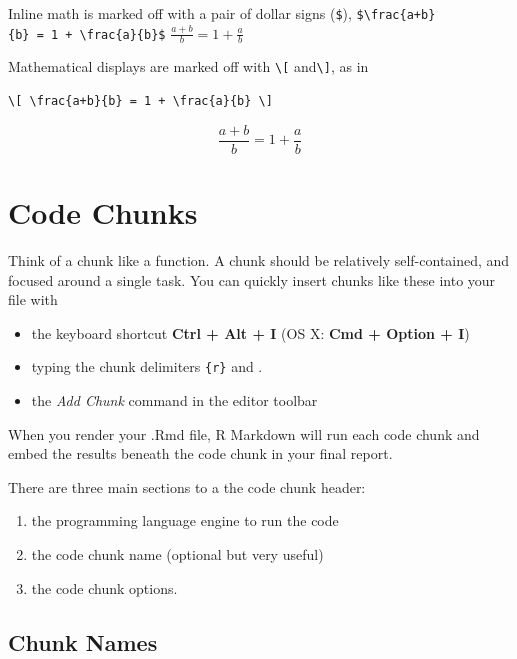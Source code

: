 \documentclass[]{book}
\providecommand{\tightlist}{%
  \setlength{\itemsep}{0pt}\setlength{\parskip}{0pt}}
\theoremstyle{definition}
\theoremstyle{definition}
\theoremstyle{definition}
\theoremstyle{remark}
\begin{document}
Inline math is marked off with a pair of dollar signs (\texttt{\$}),
\texttt{\$\textbackslash{}frac\{a+b\}\{b\}\ =\ 1\ +\ \textbackslash{}frac\{a\}\{b\}\$}
\(\frac{a+b}{b} = 1 + \frac{a}{b}\)

Mathematical displays are marked off with \texttt{\textbackslash{}{[}}
and\texttt{\textbackslash{}{]}}, as in

\begin{verbatim}
\[ \frac{a+b}{b} = 1 + \frac{a}{b} \]
\end{verbatim}

\[ \frac{a+b}{b} = 1 + \frac{a}{b} \]

\hypertarget{code-chunks}{%
\section{Code Chunks}\label{code-chunks}}

Think of a chunk like a function. A chunk should be relatively
self-contained, and focused around a single task. You can quickly insert
chunks like these into your file with

\begin{itemize}
\tightlist
\item
  the keyboard shortcut \textbf{Ctrl + Alt + I} (OS X: \textbf{Cmd +
  Option + I})
\item
  typing the chunk delimiters
  \texttt{\textasciigrave{}\textasciigrave{}\textasciigrave{}\{r\}} and
  \texttt{\textasciigrave{}\textasciigrave{}\textasciigrave{}}.
\item
  the \emph{Add Chunk} command in the editor toolbar
\end{itemize}

When you render your .Rmd file, R Markdown will run each code chunk and
embed the results beneath the code chunk in your final report.

There are three main sections to a the code chunk header:

\begin{enumerate}
\def\labelenumi{\arabic{enumi}.}
\tightlist
\item
  the programming language engine to run the code
\item
  the code chunk name (optional but very useful)
\item
  the code chunk options.
\end{enumerate}

\hypertarget{chunk-names}{%
\subsection{Chunk Names}\label{chunk-names}}
\end{document}
